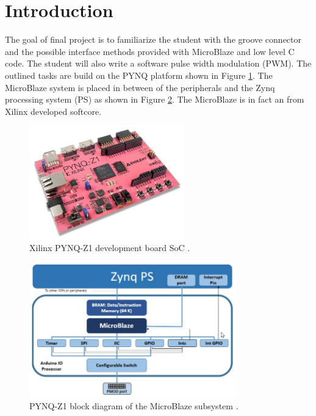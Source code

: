 \section{Introduction}\label{sec: Introduction}
The goal of final project is to familiarize the student with the groove connector and the possible interface methods provided with MicroBlaze and low level C code. The student will also write a software pulse width modulation (PWM). The outlined tasks are build on the PYNQ platform shown in Figure \ref{fig: intro1}. The MicroBlaze system is placed in between of the peripherals and the Zynq processing system (PS) as shown in Figure \ref{fig: intro2}. The MicroBlaze is in fact an from Xilinx developed softcore.

\begin{figure}[H]
	\centering
	\includegraphics[width=0.6\textwidth]{01_images/PYNQ_Hardware_Xilinx}
	\caption{Xilinx PYNQ-Z1 development board SoC \cite{XUP}.}
	\label{fig: intro1}
\end{figure}
\begin{figure}[H]
	\centering
	\includegraphics[width=0.8\textwidth]{01_images/PYNQ_Microblaze_Subsystem_Block_Diagram}
	\caption{PYNQ-Z1 block diagram of the MicroBlaze subsystem \cite{pynq_dr}.}
	\label{fig: intro2}
\end{figure}


